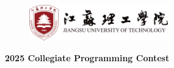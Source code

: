 \documentclass{xcpc}
\begin{document}
	\pagestyle{empty}
	
	\begin{center}
		\vspace*{12em}
		
		\begin{figure}[htbp]
			\centering
			\begin{minipage}[t]{0.48\textwidth}
				\centering
			\end{minipage}
			\begin{minipage}[t]{0.48\textwidth}
				\centering
				\includegraphics[width=6cm]{jsuttext}
			\end{minipage}
		\end{figure}
		
		{\huge\bf 2025 \schoolshort Collegiate Programming Contest\\\schoolname\\\location}
	\end{center}
	\tableofcontents
	\clearpage 
	\pagestyle{fancy}
\end{document}
